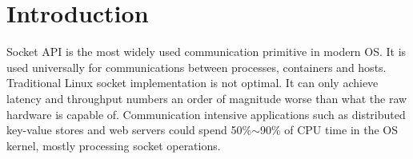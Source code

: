 \section{Introduction}
\label{sec:intro}


Socket API is the most widely used communication primitive in modern OS. It is used universally for communications between processes, containers and hosts.
Traditional Linux socket implementation is not optimal. It can only achieve latency and throughput numbers an order of magnitude worse than what the raw hardware is capable of.
Communication intensive applications such as distributed key-value stores and web servers could spend 50\%$\sim$90\% of CPU time in the OS kernel, mostly processing socket operations.

